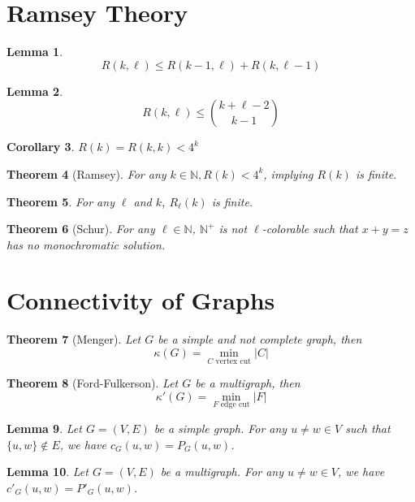 \documentclass[paper=a4, fontsize=12pt]{scrartcl} %
\newtheorem{thm}{Theorem}[section]
\newtheorem{cor}[thm]{Corollary}
\newtheorem{lem}[thm]{Lemma}
\theoremstyle{definition}
\theoremstyle{remark}
\newcommand{\N}{\mathbb{N}}
\numberwithin{equation}{section} %
\numberwithin{figure}{section} %
\numberwithin{table}{section} %
\begin{document}
\section{Ramsey Theory}
\begin{lem}
	\[R(k,\ell) \leq R(k-1, \ell) + R(k, \ell-1)\]
\end{lem}
\begin{lem}
	\[R(k,\ell) \leq \binom{k+\ell-2}{k-1}\]
\end{lem}
\begin{cor}
	$R(k) = R(k,k) < 4^k$
\end{cor}
\begin{thm}[Ramsey]
	For any $k \in \N, R(k) < 4^k$, implying $R(k)$ is finite.
\end{thm}
\begin{thm}
	For any $\ell$ and $k$, $R_{\ell}(k)$ is finite.
\end{thm}
\begin{thm}[Schur]
	For any $\ell \in \N$, $\N^+$ is not $\ell$-colorable such that $x+y=z$ has no monochromatic solution.
\end{thm}
\section{Connectivity of Graphs}
\begin{thm}[Menger]
	Let $G$ be a simple and not complete graph, then \[\kappa(G) = \min_{C \mbox{ vertex cut}} |C|\]
\end{thm}
\begin{thm}[Ford-Fulkerson]
	Let $G$ be a multigraph, then \[\kappa'(G) = \min_{F \mbox{ edge cut}} |F|\]
\end{thm}
\begin{lem}
	Let $G=(V,E)$ be a simple graph. For any $u \neq w \in V$ such that $\{u,w\} \notin E$, we have $c_G(u,w) = P_G(u,w)$.
\end{lem}
\begin{lem}
	Let $G=(V,E)$ be a multigraph. For any $u \neq w \in V$, we have $c'_G(u,w) = P'_G(u,w)$.
\end{lem}
\end{document}
